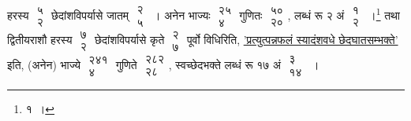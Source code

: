 \documentclass[10pt, openany]{book}
\begin{document}
{हरस्य $\begin{matrix}

\mbox{{५}}\\

\mbox{{२}}

\end{matrix}$ छेदांशविपर्यासे जातम् $\begin{matrix}

\mbox{{२}}\\

\mbox{{५}}

\end{matrix}$~। अनेन भाज्यः $\begin{matrix}

\mbox{{२५}}\\

\mbox{{४}}

\end{matrix}$ गुणितः $\begin{matrix}

\mbox{{५०}}\\

\mbox{{२०}}

\end{matrix}$, लब्धं रू २ अं $\begin{matrix}

\mbox{{१}}\\

\mbox{{२}}

\end{matrix}$~।\renewcommand{\thefootnote}{१}\footnote{१~।} तथा द्वितीयराशौ हरस्य $\begin{matrix}

\mbox{{७}}\\

\mbox{{२}}

\end{matrix}$ छेदांशविपर्यासे कृते $\begin{matrix}

\mbox{{२}}\\

\mbox{{७}}

\end{matrix}$ पूर्वो
विधिरिति, \hyperref[33.1]{'प्रत्युत्पन्नफलं स्यादंशवधे छेदघातसम्भक्ते'} इति, (अनेन) भाज्ये $\begin{matrix}

\mbox{{२४१}}\\

\mbox{{४}}

\end{matrix}$ गुणिते $\begin{matrix}

\mbox{{२८२}}\\

\mbox{{२८}}

\end{matrix}$, स्वच्छेदभक्ते लब्धं रू १७ अं $\begin{matrix}

\mbox{{३}}\\

\mbox{{१४}}

\end{matrix}$~।}
\vspace{2mm}
\end{document}

